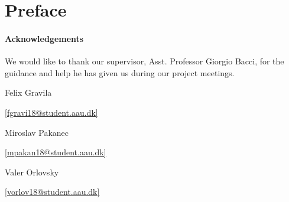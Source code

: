 \chapter*{Preface} \label{sec:forord}
\subsubsection*{Acknowledgements}
We would like to thank our supervisor, Asst. Professor Giorgio Bacci, for the guidance and help he has given us during our project meetings.
\bigskip
\newcommand*\signatureline[2]{\vspace*{2cm}\parbox{5cm}{
    \begin{center}
        \hrulefill\par#1\par#2
    \end{center}
    }
}
\newcommand*\mailto[1]{\href{mailto:#1}{[#1]}}

\begingroup
  \centering
  \signatureline{Felix Gravila}{\mailto{fgravi18@student.aau.dk}}
  \hspace{1cm}
  \signatureline{Miroslav Pakanec}{\mailto{mpakan18@student.aau.dk}}
  \hspace{1cm}
  \signatureline{Valer Orlovsky}{\mailto{vorlov18@student.aau.dk}}
\endgroup

\clearpage
